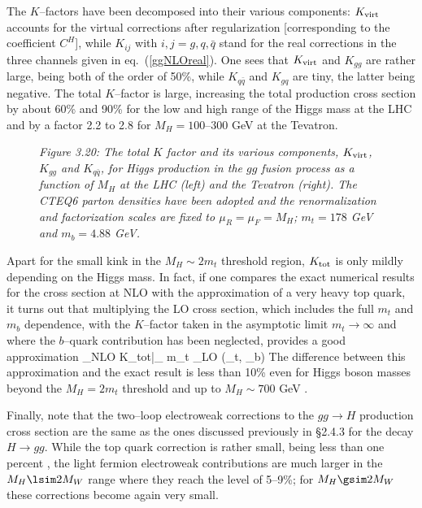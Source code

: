 The $K$--factors have been decomposed into their various components: $K_{\rm
virt}$ accounts for the virtual corrections after regularization
[corresponding to the coefficient $C^H$], while $K_{ij}$ with $i,j=g,q, \bar
q$ stand for the real corrections in the three channels given in 
eq.~(\ref{ggNLOreal}). One sees that  $K_{\rm virt}$ and $K_{gg}$  are rather
large, being both of the order of 50\%, while $K_{q\bar{q}}$ and $K_{gq}$
are tiny, the latter being negative. The total $K$--factor is large, increasing 
the total production cross section by about 60\% and 90\% for the low and high 
range of the Higgs mass at the LHC and by a factor 2.2 to 2.8 for 
$M_H=100$--300 GeV at the Tevatron.  \s

\begin{figure}[h!]
\begin{center}
\vspace*{-1.2cm}
\hspace*{-2cm}
\end{center}
\vspace*{-16.5cm}
{\it Figure 3.20: The total $K$ factor and its various components, $K_{\rm
virt}$, $K_{gg}$  and $K_{q\bar{q}}$,  for Higgs production in the $gg$
fusion process as a function of $M_H$ at the LHC (left) and the Tevatron
(right). The CTEQ6 parton densities have been adopted and the renormalization
and factorization scales are fixed to $\mu_R\!=\!\mu_F\!=\!M_H$; $m_t\!=\!178$ 
GeV and $m_b\!=\!4.88$ GeV.}
\vspace*{-3mm} 
\end{figure}

Apart for the small kink in the $M_H \sim 2m_t$ threshold region, $K_{\rm 
tot}$ is only mildly depending on the Higgs mass. In fact, if one compares the
exact numerical results for the cross section at NLO with the approximation
of a very heavy top quark, it turns out that multiplying the LO cross
section, which includes the full $m_t$ and $m_b$ dependence, with the $
K$--factor taken in the asymptotic limit $m_t \to \infty$ and where the 
$b$--quark contribution has been neglected, provides a good approximation
\beq
\sigma_{\rm NLO} \simeq K_{\rm tot}|_{ m_t \to \infty} \times \sigma_{\rm LO}
(\tau_t, \tau_b)
\eeq
The difference between this approximation and the exact result is less 
than 10\% even for Higgs boson masses beyond the $M_H =2m_t$ threshold and
up to $ M_H \sim 700$ GeV \cite{ggH-Laenen}.\s

Finally, note that the two--loop electroweak corrections to the $gg \to H$
production cross section are the same as the ones discussed previously in
\S2.4.3 for the decay $H \to gg$. While the top quark correction is rather
small, being less than one percent \cite{RCdjo}, the light fermion electroweak
contributions \cite{RCita,PepeHgg} are much larger in the $M_H \lsim 2M_W$ range
where they reach the level of 5--9\%; for $M_H \gsim 2M_W$ these corrections
become again very small. \s


